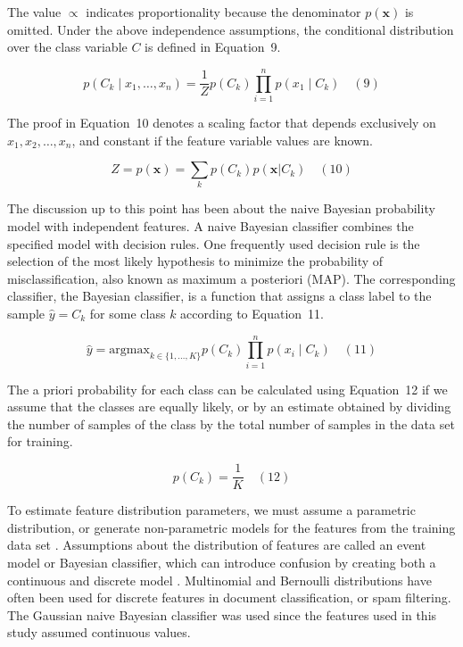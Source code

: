 \documentclass[preprint,12pt]{elsarticle}
\begin{document}
The value $\propto$ indicates proportionality because the denominator $p({\mathbf{x}})$ is omitted. Under the above independence assumptions, the conditional distribution over the class variable $C$ is defined in Equation~9.

\begin{equation}
	p(C_{k}\mid x_{1},\ldots,x_{n}) = \frac{1}{Z} p(C_{k}) \prod_{i=1}^{n} p(x_{1}\mid C_{k})
	\quad\left(9\right)
\end{equation}

The proof in Equation~10 denotes a scaling factor that depends exclusively on $x_{1}, x_{2}, \ldots, x_{n}$, and constant if the feature variable values are known.

\begin{equation}
	Z = p(\mathbf{x}) = \sum_{k} p(C_{k}) p(\mathbf{x}|C_{k})
	\quad\left(10\right)
\end{equation}

The discussion up to this point has been about the naive Bayesian probability model with independent features. A naive Bayesian classifier combines the specified model with decision rules. One frequently used decision rule is the selection of the most likely hypothesis to minimize the probability of misclassification, also known as maximum a posteriori (MAP). The corresponding classifier, the Bayesian classifier, is a function that assigns a class label to the sample $\hat{y} = C_{k}$ for some class $k$ according to Equation~11.

\begin{equation}
	\hat{y} = \mathrm{argmax}_{k\in \{1, \ldots, K\}} p(C_{k}) \prod_{i=1}^{n} p(x_{i}\mid C_{k})
	\quad\left(11\right)
\end{equation}

The a priori probability for each class can be calculated using Equation~12 if we assume that the classes are equally likely, or by an estimate obtained by dividing the number of samples of the class by the total number of samples in the data set for training.

\begin{equation}
	p(C_{k}) = \frac{1}{K}
	\quad\left(12\right)
\end{equation}

To estimate feature distribution parameters, we must assume a parametric distribution, or generate non-parametric models for the features from the training data set \cite{John2013}. Assumptions about the distribution of features are called an event model or Bayesian classifier, which can introduce confusion by creating both a continuous and discrete model \cite{Mccallum2001, Metsis2006}. Multinomial and Bernoulli distributions have often been used for discrete features in document classification, or spam filtering. The Gaussian naive Bayesian classifier was used since the features used in this study assumed continuous values.
\end{document}
